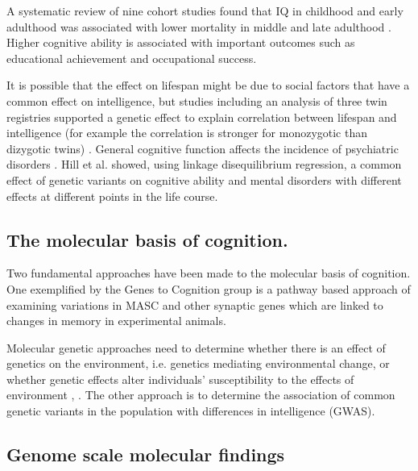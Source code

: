 A systematic review of nine cohort studies found that IQ in childhood and early adulthood was associated with lower mortality in middle and late adulthood %
\cite{batty2007premorbid}. Higher cognitive ability is associated with important outcomes such as educational achievement and occupational success.

It is possible that the effect on lifespan might be due to social factors that have a common effect on intelligence, but studies including an analysis of three twin registries supported a genetic effect to explain correlation between lifespan and intelligence (for example the correlation is stronger for monozygotic than dizygotic twins) %
\cite{arden2016association}. General cognitive function affects the incidence of psychiatric disorders %
\cite{wraw2015intelligence}. Hill et al. showed, using linkage disequilibrium regression, a common effect of genetic variants on cognitive ability and mental disorders with different effects at different points in the life course\cite{hill2016age}.

\subsection{The molecular basis of cognition.}
Two fundamental approaches have been made to the molecular basis of cognition. One exemplified by the Genes to Cognition group\cite{croning2009g2cdb} is a pathway based approach of examining variations in MASC and other synaptic genes which are linked to changes in memory in experimental animals\cite{deary2009genetic}.

Molecular genetic approaches need to determine whether there is an effect of genetics on the environment, i.e. genetics mediating environmental change, or whether genetic effects alter individuals’ susceptibility to the effects of environment
\cite{deary2009genetic}, \cite{whitehead2019reach}. The other approach is to determine the association of common genetic variants in the population with differences in intelligence (GWAS).  
\subsection{Genome scale molecular findings}

